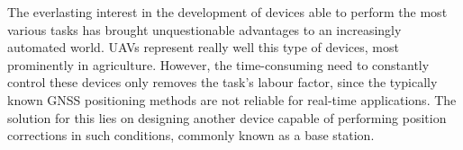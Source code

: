 






The everlasting interest in the development of devices able to perform the most various tasks has brought unquestionable advantages to an increasingly automated world. UAVs represent really well this type of devices, most prominently in agriculture. However, the time-consuming need to constantly control these devices only removes the task's labour factor, since the typically known GNSS positioning methods are not reliable for real-time applications. The solution for this lies on designing another device capable of performing position corrections in such conditions, commonly known as a base station.

